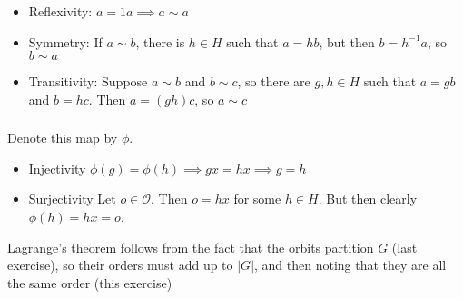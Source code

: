 \documentclass{article}
\newcommand{\inv}[1]{ {#1}^{-1} }
\newcommand{\sheaf}{ \mathcal{O} }
\begin{document}
\subsubsection{}\label{ex7p18}
\begin{itemize}
\item Reflexivity: $a = 1a \implies a \sim a$
\item Symmetry: If $a \sim b$, there is $h \in H$ such that $a=hb$, but then $b=\inv{h}a$, so $b \sim a$
\item Transitivity: Suppose $a\sim b$ and $b\sim c$, so there are $g,h\in H$ such that $a=gb$ and $b=hc$. Then $a=(gh)c$, so $a \sim c$
\end{itemize}
\subsubsection{}\label{ex7p19}
Denote this map by $\phi$. 
\begin{itemize}
\item Injectivity $\phi(g)=\phi(h)\implies gx=hx \implies g=h$
\item Surjectivity Let $o \in \sheaf$. Then $o=hx$ for some $h\in H$. But then clearly $\phi(h) = hx = o$.
\end{itemize}
Lagrange's theorem follows from the fact that the orbits partition $G$ (last exercise), so their orders must add up to $|G|$, and then noting that they are all the same order (this exercise)
\subsubsection{}\label{ex7p20}
\subsubsection{}\label{ex7p21}
\subsubsection{}\label{ex7p22}
\subsubsection{}\label{ex7p23}
\end{document}
